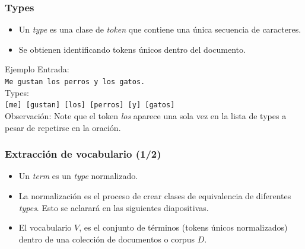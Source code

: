 \documentclass[handout]{beamer}
\begin{document}
\begin{frame}\frametitle{Types}
\begin{itemize}
 \item Un \emph{type} es una clase de \emph{token} que contiene una única secuencia de caracteres.
 \item Se obtienen identificando tokens únicos dentro del documento.
\end{itemize}

\begin{block}{Ejemplo}
    \centering
    \vspace{0.5em}
    Entrada:\\ 
    \texttt{Me gustan los perros y los gatos.}\\
    \vspace{0.5em}
    Types:\\
    \texttt{[me] [gustan] [los] [perros] [y] [gatos]}\\
    \vspace{0.5em}
    Observación: Note que el token \emph{los} aparece una sola vez en la lista de types a pesar de repetirse en la oración.
\end{block}
\end{frame}
 
\begin{frame}\frametitle{Extracción de vocabulario (1/2)}
\begin{itemize}
 \item Un \emph{term} es un \emph{type} normalizado.
 \item La normalización es el proceso de crear clases de equivalencia de diferentes \emph{types}. Esto se aclarará en las siguientes diapositivas.
 \item El vocabulario $V$, es el conjunto de términos (tokens únicos normalizados) dentro de una colección de documentos o corpus $D$.
\end{itemize}
\end{frame}
\end{document}
